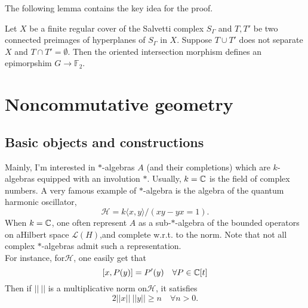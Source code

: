The following lemma contains the key idea for the proof. 
\begin{lem}
Let $X$ be a finite regular cover of the Salvetti complex $S_\Gamma$ and $T,T'$ be two connected preimages of hyperplanes of $S_\Gamma$ in $X$. Suppose $T\cup T'$ does not separate $X$ and $T\cap T'=\emptyset$. Then the oriented intersection morphism defines an epimorpshim $G \rightarrow \mathbb F_2$.
\end{lem}


\section{Noncommutative geometry}

\subsection{Basic objects and constructions}

Mainly, I'm interested in $*$-algebras $A$ (and their completions) which are $k$-algebras equipped with an involution $*$. Usually, $k=\mathbb C$ is the field of complex numbers. A very famous example of $*$-algebra is the algebra of the quantum harmonic oscillator,
\[\mathcal H = k\langle x, y\rangle / (xy -yx = 1).\]
When $k=\mathbb C$, one often represent $A$ as a sub-$*$-algebra of the bounded operators on aHilbert space $\mathcal L(H)$,and complete w.r.t. to the norm. Note that not all complex $*$-algebras admit such a representation. \\

For instance, for$\mathcal H$, one easily get that 
\[[x,P(y)] = P'(y) \quad \forall P\in \mathbb C[t]\]
Then if $||\ ||$ is a multiplicative norm on$\mathcal H$, it satisfies
\[ 2 ||x|| \ ||y|| \geq n \quad \forall n>0.\]   

